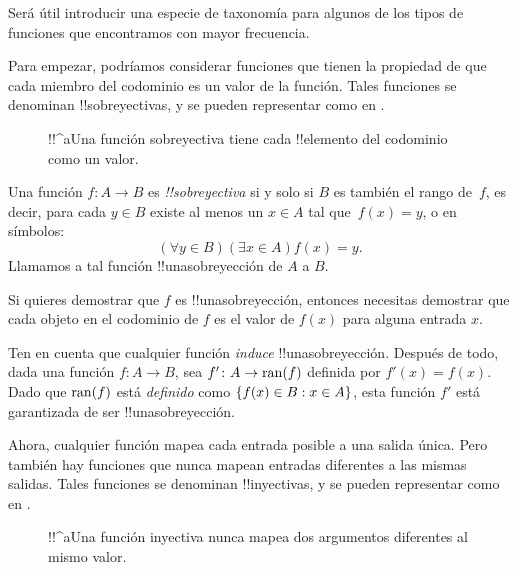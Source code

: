 \documentclass[../../../include/open-logic-section]{subfiles}
\begin{document}

\begin{explain}
Será útil introducir una especie de taxonomía para algunos de los
tipos de funciones que encontramos con mayor frecuencia.

Para empezar, podríamos considerar funciones que tienen la propiedad
de que cada miembro del codominio es un valor de la función. Tales
funciones se denominan !!{sobreyectivas}, y se pueden representar como en
.

\begin{figure}
  \caption{!!^a{Una función sobreyectiva} tiene cada !!{elemento} del
    codominio como un valor.}
\end{figure}
\end{explain}

\begin{defn}
Una función $f \colon A \rightarrow B$ es \emph{!!{sobreyectiva}} si y solo si $B$
es también el rango de~$f$, es decir, para cada $y \in B$ existe al menos
un $x \in A$ tal que~$f(x) = y$, o en símbolos:
\[
  (\forall y \in B)(\exists x \in A)f(x) = y.
\]
Llamamos a tal función !!una{sobreyección} de $A$ a $B$.
\end{defn}

\begin{explain}
Si quieres demostrar que $f$ es !!una{sobreyección}, entonces necesitas demostrar
que cada objeto en el codominio de $f$ es el valor de $f(x)$ para alguna
entrada $x$.

Ten en cuenta que cualquier función \emph{induce} !!una{sobreyección}. Después de todo,
dada una función $f \colon A \to B$, sea $f' \colon A \to \mathrm{ran}(f)$ definida por
$f'(x) = f(x)$. Dado que $\mathrm{ran}(f)$ está \emph{definido} como
$\{ f(x) \in B : x \in A \}$, esta función $f'$ está garantizada de ser
!!una{sobreyección}.
\end{explain}

\begin{explain}
Ahora, cualquier función mapea cada entrada posible a una salida única. Pero
también hay funciones que nunca mapean entradas diferentes a las mismas
salidas. Tales funciones se denominan !!{inyectivas}, y se pueden representar
como en .
\begin{figure}
  \caption{!!^a{Una función inyectiva} nunca mapea dos argumentos diferentes
    al mismo valor.}
\end{figure}
\end{explain}
\end{document}
